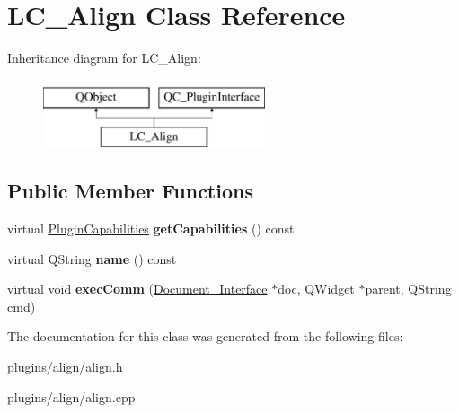 \hypertarget{classLC__Align}{\section{L\-C\-\_\-\-Align Class Reference}
\label{classLC__Align}
}
Inheritance diagram for L\-C\-\_\-\-Align\-:\begin{figure}[H]
\begin{center}
\leavevmode
\includegraphics[height=2.000000cm]{classLC__Align}
\end{center}
\end{figure}
\subsection*{Public Member Functions}
\begin{DoxyCompactItemize}
\item 
\hypertarget{classLC__Align_a9974e134920aa600951eed87da907a8b}{virtual \hyperlink{classPluginCapabilities}{Plugin\-Capabilities} {\bfseries get\-Capabilities} () const }\label{classLC__Align_a9974e134920aa600951eed87da907a8b}

\item 
\hypertarget{classLC__Align_af95203922f2b76a0ec0117b964f594b1}{virtual Q\-String {\bfseries name} () const }\label{classLC__Align_af95203922f2b76a0ec0117b964f594b1}

\item 
\hypertarget{classLC__Align_aa3aeca3eb60c0ff25a77efe75d15af6e}{virtual void {\bfseries exec\-Comm} (\hyperlink{classDocument__Interface}{Document\-\_\-\-Interface} $\ast$doc, Q\-Widget $\ast$parent, Q\-String cmd)}\label{classLC__Align_aa3aeca3eb60c0ff25a77efe75d15af6e}

\end{DoxyCompactItemize}


The documentation for this class was generated from the following files\-:\begin{DoxyCompactItemize}
\item 
plugins/align/align.\-h\item 
plugins/align/align.\-cpp\end{DoxyCompactItemize}
